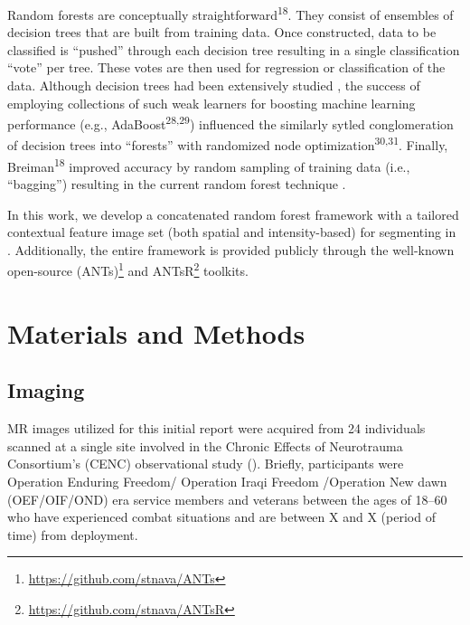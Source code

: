 \documentclass[11pt,]{article}
\let\rmarkdownfootnote\footnote%
\def\footnote{\protect\rmarkdownfootnote}
\begin{document}
Random forests are conceptually straightforward\textsuperscript{18}.
They consist of ensembles of decision trees that are built from training
data. Once constructed, data to be classified is ``pushed'' through each
decision tree resulting in a single classification ``vote'' per tree.
These votes are then used for regression or classification of the data.
Although decision trees had been extensively studied
, the success of employing collections of
such weak learners for boosting machine learning performance (e.g.,
AdaBoost\textsuperscript{28,29}) influenced the similarly sytled
conglomeration of decision trees into ``forests'' with randomized node
optimization\textsuperscript{30,31}. Finally,
Breiman\textsuperscript{18} improved accuracy by random sampling of
 training data (i.e., ``bagging'') resulting in the
current random forest technique .

In this work, we develop a concatenated random forest framework with a
tailored contextual feature image set (both spatial and intensity-based)
for segmenting  in
.
Additionally, the entire framework is provided publicly through the
well-known open-source 
(ANTs)\footnote{\url{https://github.com/stnava/ANTs}} and
ANTsR\footnote{\url{https://github.com/stnava/ANTsR}} toolkits.

\section{Materials and Methods}\label{materials-and-methods}

\subsection{Imaging}\label{imaging}

MR images utilized for this initial report were acquired from 24
individuals scanned at a single site involved in the Chronic Effects of
Neurotrauma Consortium's (CENC) observational study
().
Briefly, participants were Operation Enduring Freedom/ Operation Iraqi
Freedom /Operation New dawn (OEF/OIF/OND) era service members and
veterans between the ages of 18--60 who have experienced combat
situations and are between X and X (period of time) from deployment.
\end{document}
